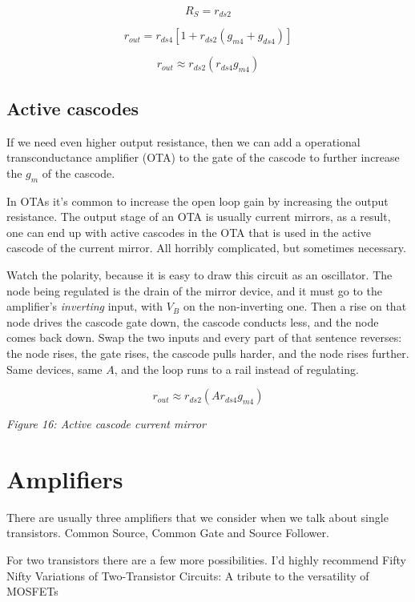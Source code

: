 \[ R_S = r_{ds2} \]

\[
r_{out} =  r_{ds4}[1 + r_{ds2}(g_{m4} + g_{ds4})] 
\]

\[
r_{out} \approx  r_{ds2}(r_{ds4}g_{m4})
\]

\subsection{Active cascodes}\label{active-cascodes}

If we need even higher output resistance, then we can add a operational
transconductance amplifier (OTA) to the gate of the cascode to further
increase the \(g_m\) of the cascode.

In OTAs it's common to increase the open loop gain by increasing the
output resistance. The output stage of an OTA is usually current
mirrors, as a result, one can end up with active cascodes in the OTA
that is used in the active cascode of the current mirror. All horribly
complicated, but sometimes necessary.

Watch the polarity, because it is easy to draw this circuit as an
oscillator. The node being regulated is the drain of the mirror device,
and it must go to the amplifier's \emph{inverting} input, with \(V_B\)
on the non-inverting one. Then a rise on that node drives the cascode
gate down, the cascode conducts less, and the node comes back down. Swap
the two inputs and every part of that sentence reverses: the node rises,
the gate rises, the cascode pulls harder, and the node rises further.
Same devices, same \(A\), and the loop runs to a rail instead of
regulating.

\[
r_{out} \approx  r_{ds2}(A r_{ds4} g_{m4})
\]


{
\centering
{}
}

\emph{Figure 16: Active cascode current mirror }

\section{Amplifiers}\label{amplifiers}

There are usually three amplifiers that we consider when we talk about
single transistors. Common Source, Common Gate and Source Follower.

For two transistors there are a few more possibilities. I'd highly
recommend Fifty Nifty Variations of Two-Transistor Circuits: A tribute
to the versatility of MOSFETs 


